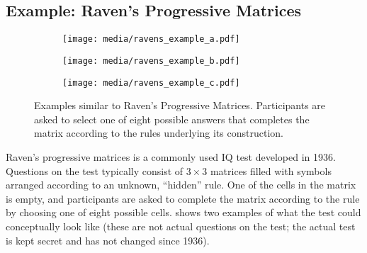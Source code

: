\documentclass[10pt,letterpaper,oneside]{article}
\begin{document}


\subsection{Example: Raven's Progressive Matrices}

\begin{figure}[t]
	\centering%
	\begin{subfigure}{0.33\textwidth}%
		\centering%
		\texttt{[image: media/ravens\_example\_a.pdf]}%
		\caption{}%
		\label{fig:ravens_example_a}%
	\end{subfigure}%
	\begin{subfigure}{0.33\textwidth}%
		\centering%
		\texttt{[image: media/ravens\_example\_b.pdf]}%
		\caption{}%
		\label{fig:ravens_example_b}%
	\end{subfigure}
	\begin{subfigure}{0.33\textwidth}%
		\centering%
		\texttt{[image: media/ravens\_example\_c.pdf]}%
		\caption{}%
		\label{fig:ravens_example_c}%
	\end{subfigure}
	\caption{Examples similar to Raven's Progressive Matrices. Participants are asked to select one of eight possible answers that completes the matrix according to the rules underlying its construction.}
	\label{fig:ravens_example}
\end{figure}

Raven's progressive matrices is a commonly used IQ test developed in 1936. Questions on the test typically consist of $3 \times 3$ matrices filled with symbols arranged according to an unknown, \enquote{hidden} rule. One of the cells in the matrix is empty, and participants are asked to complete the matrix according to the rule by choosing one of eight possible cells.  shows two examples of what the test could conceptually look like (these are not actual questions on the test; the actual test is kept secret and has not changed since 1936).
\end{document}
